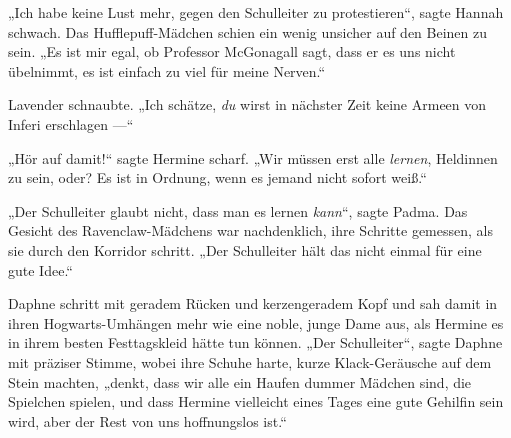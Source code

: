 „Ich habe keine Lust mehr, gegen den Schulleiter zu protestieren“, sagte Hannah schwach. Das Hufflepuff-Mädchen schien ein wenig unsicher auf den Beinen zu sein.
„Es ist mir egal, ob Professor McGonagall sagt, dass er es uns nicht übelnimmt, es ist einfach zu viel für meine Nerven.“

Lavender schnaubte.
„Ich schätze, \emph{du} wirst in nächster Zeit keine Armeen von Inferi erschlagen —“

„Hör auf damit!“ sagte Hermine scharf.
„Wir müssen erst alle \emph{lernen}, Heldinnen zu sein, oder? Es ist in Ordnung, wenn es jemand nicht sofort weiß.“

„Der Schulleiter glaubt nicht, dass man es lernen \emph{kann}“, sagte Padma. Das Gesicht des Ravenclaw-Mädchens war nachdenklich, ihre Schritte gemessen, als sie durch den Korridor schritt.
„Der Schulleiter hält das nicht einmal für eine gute Idee.“

Daphne schritt mit geradem Rücken und kerzengeradem Kopf und sah damit in ihren Hogwarts-Umhängen mehr wie eine noble, junge Dame aus, als Hermine es in ihrem besten Festtagskleid hätte tun können.
„Der Schulleiter“, sagte Daphne mit präziser Stimme, wobei ihre Schuhe harte, kurze Klack-Geräusche auf dem Stein machten, „denkt, dass wir alle ein Haufen dummer Mädchen sind, die Spielchen spielen, und dass Hermine vielleicht eines Tages eine gute Gehilfin sein wird, aber der Rest von uns hoffnungslos ist.“

